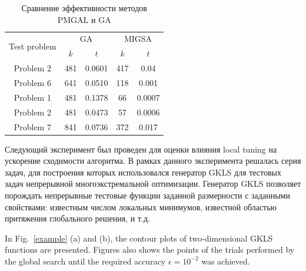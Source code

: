 \documentclass[
11pt,%
tightenlines,%
twoside,%
onecolumn,%
nofloats,%
nobibnotes,%
nofootinbib,%
superscriptaddress,%
noshowpacs,%
centertags]%
{revtex4}
\begin{document}
\begin{table}
	\caption{Сравнение эффективности методов PMGAL и GA}
	\label{tab:1}
	\center
	\begin{tabular}{|c|c|c|c|c|}
		\hline
	\multirow{2}{*}{Test problem}	 & \multicolumn{2}{c|}{ GA } &  \multicolumn{2}{c|}{MIGSA} \\
		\cline{2-3} \cline{4-5} 
		 & $k$ & $t$ &  $k$ & $t$  \\
		\hline 
		 Problem 2 \cite{Floudas}&	481 &	0.0601 & 	417 &	0.04 \\
		 Problem 6 \cite{Floudas}&	641 &	0.0510 & 	118 &	0.001 \\
		 Problem 1 \cite{Deep}   &	481 &	0.1378 & 	66 &	0.0007 \\
		 Problem 2 \cite{Deep}   &	481 &	0.0473 & 	57 &	0.0006 \\
		 Problem 7 \cite{Deep}   &	841 &	0.0736 &  372	 &	0.017 \\
		\hline
	\end{tabular}
\end{table}	


Следующий эксперимент был проведен для оценки влияния local tuning на ускорение сходимости алгоритма. В рамках данного эксперимента решалась серия задач, для построения которых использовался генератор GKLS \cite{Gaviano} для тестовых задач непрерывной многоэкстремальной оптимизации. Генератор GKLS позволяет порождать непрерывные тестовые функции заданной размерности с заданными свойствами: известным числом локальных минимумов, известной областью притяжения глобального решения, и т.д.  

In Fig.~\ref{example} (a) and (b), the contour plots of two-dimensional GKLS functions are presented. Figures also shows the points of the trials performed by the global search until the required accuracy $\epsilon=10^{-2}$ was achieved.
\end{document}
